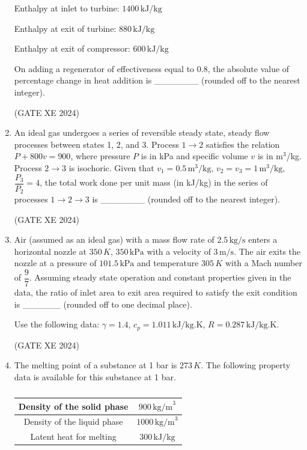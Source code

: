 \documentclass[12pt]{article}
\begin{document}
\begin{enumerate}
Enthalpy at inlet to turbine: $1400 \, \mathrm{kJ/kg}$  

Enthalpy at exit of turbine: $880 \, \mathrm{kJ/kg}$  

Enthalpy at exit of compressor: $600 \, \mathrm{kJ/kg}$  

On adding a regenerator of effectiveness equal to $0.8$, the absolute value of percentage change in heat addition is \_\_\_\_\_\_\_ (rounded off to the nearest integer).  

(GATE XE 2024)

\item An ideal gas undergoes a series of reversible steady state, steady flow processes between states 1, 2, and 3. Process $1 \rightarrow 2$ satisfies the relation $P + 800v = 900$, where pressure $P$ is in kPa and specific volume $v$ is in m$^3$/kg. Process $2 \rightarrow 3$ is isochoric. Given that $v_1 = 0.5 \, \text{m}^3/\text{kg}$, $v_2 = v_3 = 1 \, \text{m}^3/\text{kg}$, $\dfrac{P_3}{P_2} = 4$, the total work done per unit mass (in kJ/kg) in the series of processes $1 \rightarrow 2 \rightarrow 3$ is \_\_\_\_\_\_\_ (rounded off to the nearest integer).  

(GATE XE 2024)

\item Air (assumed as an ideal gas) with a mass flow rate of $2.5 \, \text{kg/s}$ enters a horizontal nozzle at $350 \, K$, $350 \, \text{kPa}$ with a velocity of $3 \, \text{m/s}$. The air exits the nozzle at a pressure of $101.5 \, \text{kPa}$ and temperature $305 \, K$ with a Mach number of $\dfrac{9}{7}$. Assuming steady state operation and constant properties given in the data, the ratio of inlet area to exit area required to satisfy the exit condition is \_\_\_\_\_\_ (rounded off to one decimal place).  

Use the following data: $\gamma = 1.4$, $c_p = 1.011 \, \text{kJ/kg.K}$, $R = 0.287 \, \text{kJ/kg.K}$.  

(GATE XE 2024)

\item The melting point of a substance at 1 bar is $273 \, K$. The following property data is available for this substance at 1 bar.  

\begin{table}[H]
\centering
\caption{} \label{}
\begin{tabular}{|c|c|}
\hline
Density of the solid phase & $900 \, \text{kg/m}^3$ \\
\hline
Density of the liquid phase & $1000 \, \text{kg/m}^3$ \\
\hline
Latent heat for melting & $300 \, \text{kJ/kg}$ \\
\hline
\end{tabular}
\end{table}


\end{enumerate}
\end{document}
